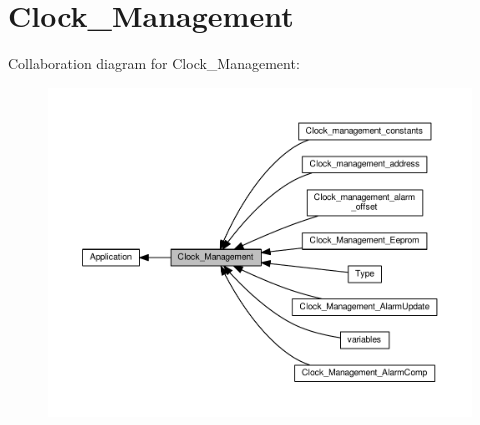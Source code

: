 \hypertarget{group___clock___management}{}\section{Clock\+\_\+\+Management}
\label{group___clock___management}
Collaboration diagram for Clock\+\_\+\+Management\+:\nopagebreak
\begin{figure}[H]
\begin{center}
\leavevmode
\includegraphics[width=350pt]{d5/d84/group___clock___management}
\end{center}
\end{figure}
